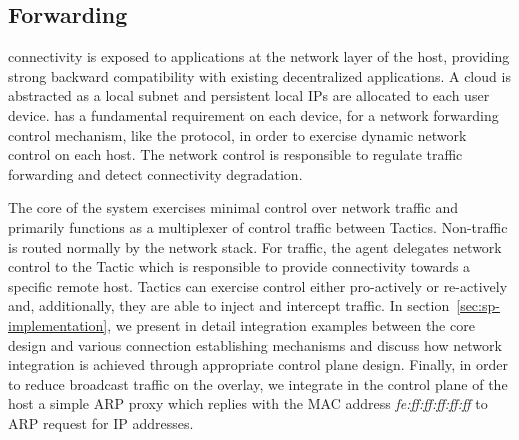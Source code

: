 

\subsection{Forwarding} \label{signpost-forwarding}

\signpost connectivity is exposed to applications  at the network layer of the
host, providing strong backward compatibility with existing decentralized
applications. A \signpost cloud is abstracted as a local subnet and persistent
local IPs are allocated to each user device. \signpost has a fundamental requirement on
each device, for a network forwarding control mechanism, like the \of protocol,
in order to exercise dynamic network control on each host. The \signpost network
control is responsible to regulate traffic forwarding and detect connectivity
degradation.

The core of the \signpost system exercises minimal control over network traffic
and primarily functions as a multiplexer of control traffic between Tactics.
Non-\signpost traffic is routed normally by the network stack.  For \signpost
traffic, the \signpost agent delegates network control to the Tactic which is 
responsible to provide connectivity towards a specific remote \signpost host.
Tactics can exercise control either pro-actively or re-actively and,
additionally, they are able to inject and intercept traffic. In
section~\ref{sec:sp-implementation}, we present in detail integration examples
between the \signpost core design and various connection establishing mechanisms
and discuss how network integration is achieved through appropriate control
plane design.  Finally, in order to reduce broadcast traffic on the
\signpost overlay, we integrate in the control plane of the host a simple
ARP proxy which replies with the MAC address {\it fe:ff:ff:ff:ff:ff}\/ to
ARP request for \signpost IP addresses. 

